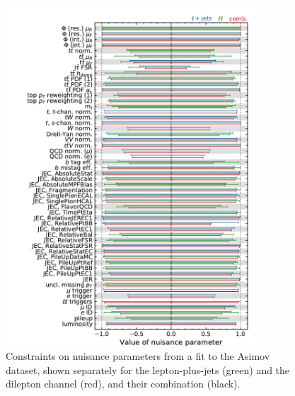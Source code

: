 \begin{figure}[!Hhtb]
\centering
\includegraphics[width=0.85\textwidth,keepaspectratio=true]{fig/app5/impacts/constraints.pdf}
\caption{Constraints on nuisance parameters from a fit to the Asimov dataset, shown separately for the lepton-plus-jets (green) and the dilepton channel (red), and their combination (black).}
\label{fig:impacts_constraints}
\end{figure}

